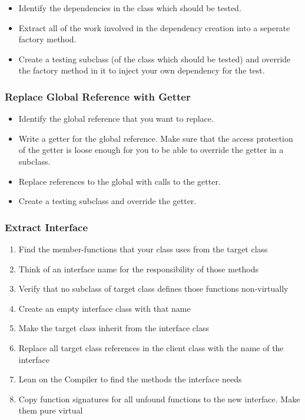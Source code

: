 \begin{itemize}
\tightlist
\item
  Identify the dependencies in the class which should be tested.
\item
  Extract all of the work involved in the dependency creation into a
  seperate factory method.
\item
  Create a testing subclass (of the class which should be tested) and
  override the factory method in it to inject your own dependency for
  the test.
\end{itemize}

\hypertarget{replace-global-reference-with-getter}{%
\subsubsection{Replace Global Reference with
Getter}\label{replace-global-reference-with-getter}}

\begin{itemize}
\tightlist
\item
  Identify the global reference that you want to replace.
\item
  Write a getter for the global reference. Make sure that the access
  protection of the getter is loose enough for you to be able to
  override the getter in a subclass.
\item
  Replace references to the global with calls to the getter.
\item
  Create a testing subclass and override the getter.
\end{itemize}

\hypertarget{extract-interface}{%
\subsubsection{Extract Interface}\label{extract-interface}}

\begin{enumerate}
\def\labelenumi{\arabic{enumi}.}
\tightlist
\item
  Find the member-functions that your class uses from the target class
\item
  Think of an interface name for the responsibility of those methods
\item
  Verify that no subclass of target class defines those functions
  non-virtually
\item
  Create an empty interface class with that name
\item
  Make the target class inherit from the interface class
\item
  Replace all target class references in the client class with the name
  of the interface
\item
  Lean on the Compiler to find the methods the interface needs
\item
  Copy function signatures for all unfound functions to the new
  interface. Make them pure virtual
\end{enumerate}

